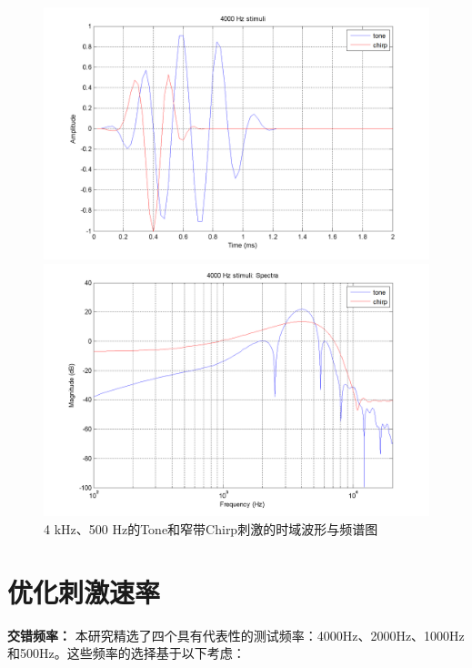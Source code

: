 \begin{figure}[H]
    \vspace{0.2cm}
    
    \begin{minipage}{0.48\textwidth}
        \includegraphics[width=\textwidth]{images/4000hzStimuli.png}
    \end{minipage}
    \hfill
    \begin{minipage}{0.48\textwidth}
        \includegraphics[width=\textwidth]{images/4000hzSpectra.png}
    \end{minipage}
    \caption{4 kHz、500 Hz的Tone和窄带Chirp刺激的时域波形与频谱图}
    \label{fig:4k500hzToneAndNarrowbandChirp}
\end{figure}
\FloatBarrier 
\section{优化刺激速率}

\textbf{交错频率：}
本研究精选了四个具有代表性的测试频率：4000Hz、2000Hz、1000Hz和500Hz。这些频率的选择基于以下考虑：

